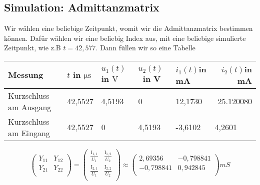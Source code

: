 \subsection{Simulation: Admittanzmatrix}
\label{subsec:4_simulation}
%
%
Wir wählen eine beliebige Zeitpunkt, womit wir die Admittanzmatrix bestimmen können. Dafür wählen wir eine beliebig Index aus, mit eine beliebige simulierte Zeitpunkt, wie z.B $t=42,577$.
Dann füllen wir so eine Tabelle
\begin{table}[H]
\begin{tabular}{l|lll|lr} 
\toprule
Messung & $t$ in $\si{\micro\second}$ & $u_1(t)$ in $\si{\volt}$ & \textcolor[rgb]{0,0.102,0.118}{\textbf{\textbf{$u_2(t)$~}}}\textcolor[rgb]{0,0.102,0.118}{\textbf{\textbf{in V}}} & \textcolor[rgb]{0,0.102,0.118}{}$i_1(t) $\textcolor[rgb]{0,0.102,0.118}{in mA} & $i_2(t)$\textcolor[rgb]{0,0.102,0.118}{in mA}  \\ 
\hline 
\textcolor[rgb]{0,0.102,0.118}{Kurzschluss am Ausgang} & 42{,}5527                                                                                                                                                                          & 4{,}5193                                                                                         & 0                                                                                                                 & 12,1730                                                                        & 25.120080                                      \\
\textcolor[rgb]{0,0.102,0.118}{Kurzschluss am Eingang} & 42,5527                                                                                                                                                                          & 0                                                                                              & 4,5193                                                                                                            & -3,6102                                                                        & \multicolumn{1}{l}{4,2601}                     \\
\bottomrule
\end{tabular}
\end{table}
%
\[
 \left(
\begin{array}{cc}
 Y_{11} & Y_{12} \\
 Y_{21} & Y_{22} \\
\end{array}
\right)=\left(
\begin{array}{cc}
 \frac{\text{I}_{1,1}}{U_{1}} & \frac{\text{I}_{1,2}}{U_{2}} \\
 \frac{\text{I}_{2,1}}{U_{1}} & \frac{\text{I}_{2,2}}{U_{2}} \\
\end{array}
\right)\approx \left(
\begin{array}{cc}
2,69356 & -0,798841 \\
 -0,798841 & 0,942845 \\
\end{array}
\right) mS 
\]
\begin{flushright}
\textit{\autorA}
\end{flushright}
%
%
%
%